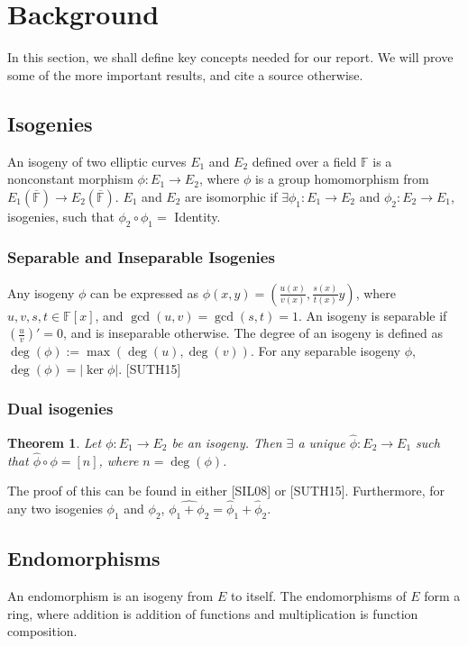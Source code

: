 \documentclass[12pt,twoside]{article}
\newcommand\abs[1]{\left|#1\right|}
\newtheorem{theorem}{Theorem}
\begin{document}
\section{Background}

In this section, we shall define key concepts needed for our report. We will prove some of the more important results, and cite a source otherwise.

\subsection{Isogenies} 
An isogeny of two elliptic curves $E_1$ and $E_2$ defined over a field $\mathbb F$ is a nonconstant morphism $\phi: E_1 \to E_2$, where $\phi$ is a group homomorphism from $E_1(\overline{\mathbb F}) \to E_2(\overline{\mathbb F})$. $E_1$ and $E_2$ are isomorphic if $\exists \phi_1: E_1 \to E_2$ and $\phi_2: E_2 \to E_1$, isogenies, such that $\phi_2 \circ \phi_1 =  $ Identity.

\subsubsection{Separable and Inseparable Isogenies}
Any isogeny $\phi$ can be expressed as $\phi(x,y) = (\frac{u(x)}{v(x)}, \frac{s(x)}{t(x)}y)$, where $u,v,s,t \in \mathbb F[x]$, and $\gcd(u,v) = \gcd(s,t) = 1$.
An isogeny is separable if $(\frac{u}{v})' = 0$, and is inseparable otherwise. The degree of an isogeny is defined as $\deg(\phi) := \max(\deg(u), \deg(v))$.
For any separable isogeny $\phi$, $\deg(\phi) = \abs{ \ker \phi}$. [SUTH15]

\subsubsection{Dual isogenies}
\begin{theorem}
Let $\phi: E_1 \to E_2$ be an isogeny. Then $\exists$ a unique $\hat{\phi}: E_2 \to E_1$ such that $\hat \phi \circ \phi = [n]$, where $n = \deg(\phi)$.
\end{theorem}
\noindent The proof of this can be found in either [SIL08] or [SUTH15]. Furthermore, for any two isogenies $\phi_1$ and $\phi_2$, $\widehat{\phi_1 + \phi_2} = \hat \phi_1 + \hat \phi_2$.
\subsection{Endomorphisms}

An endomorphism is an isogeny from $E$ to itself. The endomorphisms of $E$ form a ring, where addition is addition of functions and multiplication is function composition.
\end{document}
